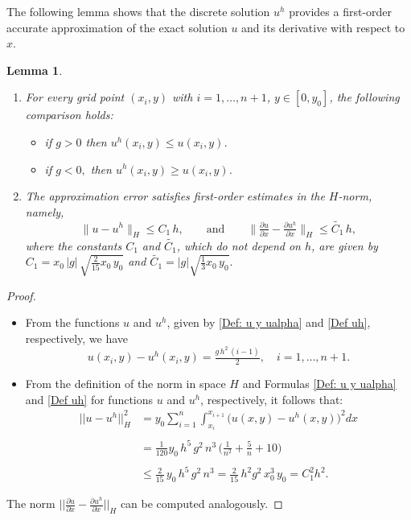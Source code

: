 \documentclass[11pt]{article}
\newcommand{\dee}{d}
\newcommand{\bint}{\displaystyle\int}
\newcommand\pder[2][]{\ensuremath{\tfrac{\partial#1}{\partial#2}}}
\newtheorem{Lemma}{Lemma}
\begin{document}
The following lemma{ shows that the discrete solution ${u^h}$ provides a first-order accurate approximation of the exact solution $u$ and its derivative with respect to $x$.}

  \begin{Lemma}\label{Cota u uh} $ $
    \begin{enumerate}   	
\item[(a)]  For every %
 {grid point} $(x_i,y)$ with $i=1,\ldots, n+1$, $y\in[0,y_0]$, {the following comparison holds}: 
    				\begin{itemize}
    						\item [(i)] if $g > 0$  then ${ u^h}(x_i,y) \leq u(x_i,y)$.
 
    						\item [(ii)] if $g < 0,$ then ${ u^h}(x_i,y) \geq u(x_i,y)$.
    				\end{itemize}    
    				
\item[(b)]  {The approximation error satisfies first-order estimates in the $H$-norm, namely,}
    		\[\lVert u-{ u^h} \rVert _H \leq  C_1\,h, \qquad \text{and}\qquad
\lVert \pder[u]{x}-\pder[{u^h}]{x} \rVert _H \leq \widetilde{C_{1}}\, h, \]
    		where {the  constants $C_1$ and $\widetilde{C_1}$, which do not depend on $h$,  are given by }
    		$C_1= x_0\,|g| \,\sqrt{\tfrac{2}{15}x_0\, y_0}$ and $\widetilde{C_{1}}= |g|\sqrt{\tfrac{1}{3}x_0 \, y_0}. $
    \end{enumerate}
    
    \end{Lemma}
\begin{proof} $ $

    \begin{itemize}
     \item[(a)] From the functions $u$ and ${ u^h}$, {given by \eqref{Def: u y ualpha} and \eqref{Def uh}, respectively}, we have 
    			\[ u(x_i, y) - { u^h}(x_i,y)=   \tfrac{g\,h^2 \,(i-1)}{2}, \quad i=1, \ldots , n+1.\] 
      
     \item[(b)] From the definition of the norm in space $H$ and Formulas \eqref{Def: u y ualpha} and \eqref{Def uh} for functions $u$ and ${ u^h}$, respectively, it follows that: 
     $$\begin{array}{ll}
     ||u-{ u^h}||_{H}^2& =y_0 \displaystyle\sum\limits_{i=1}^n \bint_{x_i}^{x_{i+1}}  \big(u(x,y)-{ u^h}(x,y)\big)^2  \dee x\\ 
     \\
    &=\frac{1}{120} y_0 \, h^5\, g^2\, n^3\,\big(\frac{1}{n^2}+\frac{5}{n}+10 \big)\\ 
    \\
        &\leq \frac{2}{15}\,y_0\, h^5\, g^2\, n^3=\frac{2}{15}\, h^2 g^2 \,x_0^3\,y_0=C_1^2 h^2.
     \end{array}$$
    \end{itemize}
The norm  $||\pder[u]{x}-\pder[{u^{h}}]{x}||_{H}$ can be computed analogously.
\end{proof}
\end{document}
